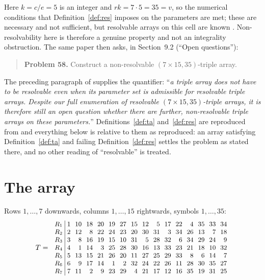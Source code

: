 \documentclass[11pt]{amsart}
\theoremstyle{definition}
\begin{document}
Here $k=c/e=5$ is an integer and $rk=7\cdot 5=35=v$, so the numerical conditions that
Definition~\ref{def:res} imposes on the parameters are met; these are necessary and not
sufficient, but resolvable arrays on this cell are known \cite{GO}. Non-resolvability here
is therefore a genuine property and not an integrality obstruction. The same paper then
asks, in Section~9.2 (``Open questions''):

\begin{quote}
\textbf{Problem 58.} Construct a non-resolvable $(7\times 15,35)$-triple array.
\end{quote}

The preceding paragraph of \cite{GO} supplies the quantifier: ``\emph{a triple array does
not have to be resolvable even when its parameter set is admissible for resolvable triple
arrays. Despite our full enumeration of resolvable $(7\times 15,35)$-triple arrays, it is
therefore still an open question whether there are further, non-resolvable triple arrays on
these parameters.}'' Definitions~\ref{def:ta} and~\ref{def:res} are reproduced from
\cite{GO} and everything below is relative to them as reproduced: an array satisfying
Definition~\ref{def:ta} and failing Definition~\ref{def:res} settles the problem as stated
there, and no other reading of ``resolvable'' is treated.

\section{The array}

Rows $1,\dots,7$ downwards, columns $1,\dots,15$ rightwards, symbols $1,\dots,35$:
\[
{\small\setlength{\arraycolsep}{3.2pt}
T=\ \begin{array}{r|rrrrrrrrrrrrrrr}
R_1 &  1 & 10 & 18 & 20 & 19 & 27 & 15 & 12 &  5 & 17 & 22 &  4 & 35 & 33 & 34\\
R_2 &  2 & 12 &  8 & 22 & 24 & 23 & 20 & 30 & 31 &  3 & 34 & 26 & 13 &  7 & 18\\
R_3 &  3 &  8 & 16 & 19 & 15 & 10 & 31 &  5 & 28 & 32 &  6 & 34 & 29 & 24 &  9\\
R_4 &  4 &  1 & 14 &  3 & 25 & 28 & 30 & 16 & 13 & 33 & 23 & 21 & 18 & 10 & 32\\
R_5 &  5 & 13 & 15 & 21 & 26 & 20 & 11 & 27 & 25 & 29 & 33 &  8 &  6 & 14 &  7\\
R_6 &  6 &  9 & 17 & 14 &  1 &  2 & 32 & 24 & 22 & 26 & 11 & 28 & 30 & 35 & 27\\
R_7 &  7 & 11 &  2 &  9 & 23 & 29 &  4 & 21 & 17 & 12 & 16 & 35 & 19 & 31 & 25
\end{array}}
\]
\end{document}
